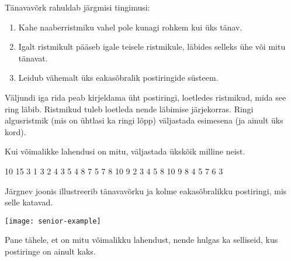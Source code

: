 \documentclass{boi2014-et}
\begin{document}
    Tänavavõrk rahuldab järgmisi tingimusi:
    \begin{enumerate}
        \item Kahe naaberristmiku vahel pole kunagi rohkem kui üks tänav.
        \item Igalt ristmikult pääseb igale teisele ristmikule,
            läbides selleks ühe või mitu tänavat.
        \item Leidub vähemalt üks eakasõbralik postiringide süsteem.
    \end{enumerate}

    \Output

    Väljundi iga rida peab kirjeldama üht postiringi, loetledes ristmikud,
    mida see ring läbib. Ristmikud tuleb loetleda nende läbimise järjekorras.
    Ringi algusristmik (mis on ühtlasi ka ringi lõpp) väljastada esimesena
    (ja ainult üks kord).

    Kui võimalikke lahendusi on mitu, väljastada ükskõik milline neist.

    \Example

    \example
    {
        10 15  3  1 3  2 4  3 5  4 8  7  5 7  8  10  9
    }
    {
        2 3 4 5 8 10 9  8 4  5 7 6 3
    }
    {
        Järgnev joonis illustreerib tänavavõrku ja kolme eakasõbralikku
        postiringi, mis selle katavad.

        \texttt{[image: senior-example]}

        Pane tähele, et on mitu võimalikku lahendust, nende hulgas ka
        selliseid, kus postiringe on ainult kaks.
    }
\end{document}
